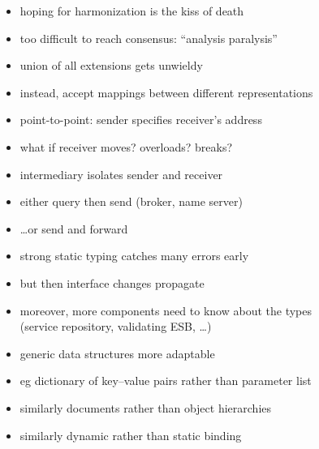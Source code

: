 \documentclass{sepslide-soa-faked} %
\begin{document}
\begin{slide}
\begin{itemize}
\item hoping for harmonization is the kiss of death
\item too difficult to reach consensus: ``analysis paralysis''
\item union of all extensions gets unwieldy
\item instead, accept mappings between different representations
\end{itemize}
\end{slide}

\begin{slide}
\begin{itemize}
\item point-to-point: sender specifies receiver's address
\item what if receiver moves? overloads? breaks?
\item intermediary isolates sender and receiver
\item either query then send (broker, name server)
\item \ldots or send and forward
\end{itemize}
\end{slide}

\begin{slide}
\begin{itemize}
\item strong static typing catches many errors early
\item but then interface changes propagate
\item moreover, more components need to know about the types \\
  (service repository, validating ESB, \ldots)
\item generic data structures more adaptable
\item eg dictionary of key--value pairs rather than parameter list
\medskip
\item similarly documents rather than object hierarchies
\item similarly dynamic rather than static binding
\end{itemize}
\end{slide}
\end{document}
